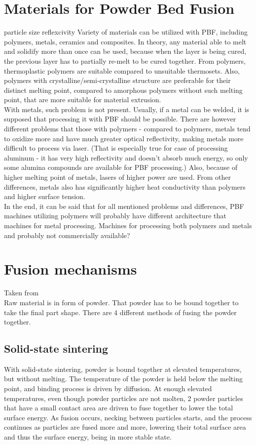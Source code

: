\documentclass[a4paper, twoside, 11pt]{report}
\begin{document}
\section{Materials for Powder Bed Fusion}
particle size reflexcivity
Variety of materials can be utilized with PBF, including polymers, metals, ceramics and composites. In theory, any material able to melt and solidify more than once can be used, because when the layer is being cured, the previous layer has to partially re-melt to be cured together. From polymers, thermoplastic polymers are suitable compared to unsuitable thermosets. Also, polymers with crystalline/semi-crystalline structure are preferable for their distinct melting point, compared to amorphous polymers without such melting point, that are more suitable for material extrusion.\\
	With metals, such problem is not present. Usually, if a metal can be welded, it is supposed that processing it with PBF should be possible. There are however different problems that those with polymers - compared to polymers, metals tend to oxidize more and have much greater optical reflectivity, making metals more difficult to process via laser. (That is especially true for case of processing aluminum - it has very high reflectivity and doesn't absorb much energy, so only some alumina compounds are available for PBF processing.) Also, because of higher melting point of metals, lasers of higher power are used. From other differences, metals also has significantly higher heat conductivity than polymers and higher surface tension.\\
	In the end, it can be said that for all mentioned problems and differences, PBF machines utilizing polymers will probably have different architecture that machines for metal processing. Machines for processing both polymers and metals and probably not commercially available?

\section{Fusion mechanisms}
Taken from \cite{AMT}\\
Raw material is in form of powder. That powder has to be bound together to take the final part shape. There are 4 different methods of  fusing the powder together.
\subsection{Solid-state sintering}
With solid-state sintering, powder is bound together at elevated temperatures, but without melting. The temperature of the powder is held below the melting point, and binding process is driven by diffusion. At enough elevated temperatures, even though powder particles are not molten, 2 powder particles that have a small contact area are driven to fuse together to lower the total surface energy.
As fusion occurs, necking between particles starts, and the process continues as particles are fused more and more, lowering their total surface area and thus the surface energy, being in more stable state.\\
\end{document}
